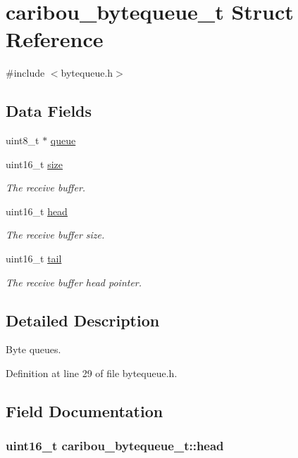 \hypertarget{structcaribou__bytequeue__t}{\section{caribou\-\_\-bytequeue\-\_\-t Struct Reference}
\label{structcaribou__bytequeue__t}
}


{\ttfamily \#include $<$bytequeue.\-h$>$}

\subsection*{Data Fields}
\begin{DoxyCompactItemize}
\item 
uint8\-\_\-t $\ast$ \hyperlink{structcaribou__bytequeue__t_a4a4aa3f8ed5e7e7e66f7da7a2cb7720e}{queue}
\item 
uint16\-\_\-t \hyperlink{structcaribou__bytequeue__t_a0f88b0ee081def2ac171173e3e520980}{size}
\begin{DoxyCompactList}\small\item\em The receive buffer. \end{DoxyCompactList}\item 
uint16\-\_\-t \hyperlink{structcaribou__bytequeue__t_a5dc9b7ce1ee37c0ca3dc5cb37650aa4b}{head}
\begin{DoxyCompactList}\small\item\em The receive buffer size. \end{DoxyCompactList}\item 
uint16\-\_\-t \hyperlink{structcaribou__bytequeue__t_a566eaeca029373cd7f187cc2e622b3f8}{tail}
\begin{DoxyCompactList}\small\item\em The receive buffer head pointer. \end{DoxyCompactList}\end{DoxyCompactItemize}


\subsection{Detailed Description}
Byte queues. 

Definition at line 29 of file bytequeue.\-h.



\subsection{Field Documentation}
\hypertarget{structcaribou__bytequeue__t_a5dc9b7ce1ee37c0ca3dc5cb37650aa4b}{
\subsubsection[{head}]{\setlength{\rightskip}{0pt plus 5cm}uint16\-\_\-t caribou\-\_\-bytequeue\-\_\-t\-::head}}\label{structcaribou__bytequeue__t_a5dc9b7ce1ee37c0ca3dc5cb37650aa4b}


